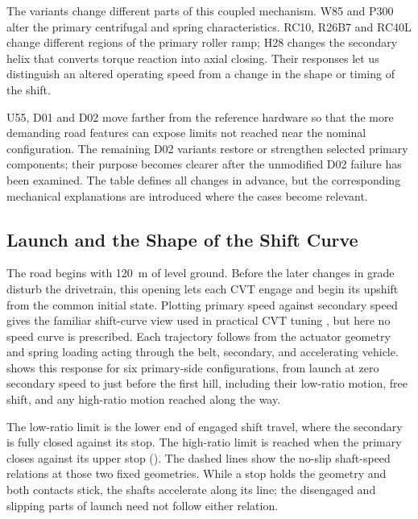 \documentclass[11pt]{report}
\numberwithin{equation}{section}
\begin{document}
The variants change different parts of this coupled mechanism. W85 and
P300 alter the primary centrifugal and spring characteristics. RC10,
R26B7 and RC40L change different regions of the primary roller ramp;
H28 changes the secondary helix that converts torque reaction into
axial closing. Their responses let us distinguish an altered operating
speed from a change in the shape or timing of the shift.

U55, D01 and D02 move farther from the reference hardware so that
the more demanding road features can expose limits not reached near
the nominal configuration. The remaining D02 variants restore or
strengthen selected primary components; their purpose becomes clearer
after the unmodified D02 failure has been examined. The table defines
all changes in advance, but the corresponding mechanical explanations
are introduced where the cases become relevant.

\subsection{Launch and the Shape of the Shift Curve}
\label{sec:results_launch_upshift}

The road begins with \SI{120}{m} of level ground. Before the later changes in
grade disturb the drivetrain, this opening lets each CVT engage and begin its
upshift from the common initial state. Plotting primary speed against secondary
speed gives the familiar shift-curve view used in practical CVT tuning
\citep{Aaen2007,Skinner2020}, but here no speed curve is prescribed. Each
trajectory follows from the actuator geometry and spring loading acting
through the belt, secondary, and accelerating vehicle.
 shows this response for six primary-side
configurations, from launch at zero secondary speed to just before the first hill, including
their low-ratio motion, free shift, and any high-ratio motion reached along
the way.

The low-ratio limit is the lower end of engaged shift travel, where the
secondary is fully closed against its stop. The high-ratio limit is reached
when the primary closes against its upper stop
(). The
dashed lines show the no-slip shaft-speed relations at those two fixed
geometries. While a stop holds the geometry and both contacts stick, the
shafts accelerate along its line; the disengaged and slipping parts of launch
need not follow either relation.
\end{document}
